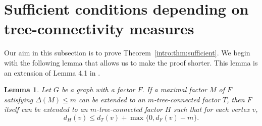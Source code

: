 \documentclass[10pt,bezier]{article}
\newtheorem{prelem}[prethm]{{\bf Lemma}}
\newenvironment{lem}{\begin{prelem}{\hspace{-0.5
em}{\bf.}}}{\end{prelem}}
\begin{document}
\section{Sufficient conditions depending on tree-connectivity measures}
%
Our aim in this subsection is to prove Theorem~\ref{intro:thm:sufficient}.
We begin with the following lemma that allows us to make the proof shorter. 
This lemma is an extension of Lemma 4.1 in \cite{ClosedWalks}.
%
\begin{lem}\label{lem:maximal-matching}
{Let $G$ be a graph with a factor $F$.
If a maximal factor $M$ of $F$ satisfying $\Delta(M)\le m$ can be extended to an $m$-tree-connected factor $T$, 
then $F$ itself can be extended to an $m$-tree-connected factor $H$ such that for each vertex $v$,
 $$d_H(v)\le d_T(v)+\max\{0, d_F(v)-m\}.$$
}\end{lem}
%
\end{document}
